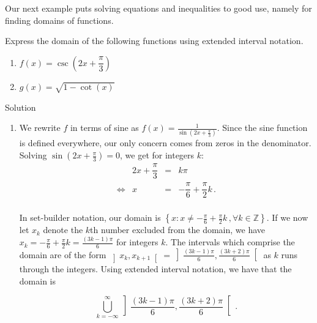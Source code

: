 Our next example puts solving equations and inequalities to good use, namely for finding domains of functions.


\begin{example}  \label{TrigDomainEx1} Express the domain of the following functions using extended interval notation.
\begin{multicols}{2}
\begin{enumerate}

\item  $f(x) = \csc\left(2x + \dfrac{\pi}{3}\right)$
\item  $g(x) = \sqrt{1 - \cot(x)}$

\end{enumerate}

\end{multicols}

\ifvc\pagebreak\fi
{}Solution 

\begin{enumerate}

\item  We rewrite $f$ in terms of sine as $f(x) = \frac{1}{\sin\left(2x + \frac{\pi}{3}\right)}$.  Since the sine function is defined everywhere, our only concern comes from zeros in the denominator.  Solving $\sin\left(2x + \frac{\pi}{3}\right) = 0$, we get for integers $k$:
\renewcommand{\arraystretch}{1}%
\[ \begin{array}{rrcl}
&2x +\dfrac{\pi}{3} &=& k\pi  \\
\Leftrightarrow&x &=& -\dfrac{\pi}{6} + \dfrac{\pi}{2} k \,. \\ \end{array} \]

In set-builder notation, our domain is  $\left\{ x : x \neq  -\frac{\pi}{6} + \frac{\pi}{2} k \,, \forall k\in\mathbb{Z} \right\}$. If we now  let $x_k$ denote the $k$th number excluded from the domain, we have  $x_k = -\frac{\pi}{6} + \frac{\pi}{2} k = \frac{(3k-1)\pi}{6}$ for integers $k$.  The intervals which comprise the domain are of the form $\left]x_k, x_{k+1}  \right[ = \left]\frac{(3k-1)\pi}{6}, \frac{(3k+2)\pi}{6} \right[$ as $k$ runs through the integers.  Using extended interval notation, we have that the domain is

\[ \bigcup_{k = -\infty}^{\infty}  \left]\dfrac{(3k-1)\pi}{6}, \dfrac{(3k+2)\pi}{6} \right[\,.\]


\end{enumerate}
\end{example}
